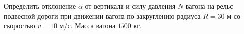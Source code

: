 Определить отклонение $\alpha$ от вертикали и силу давления $N$ вагона
на рельс подвесной дороги при движении вагона по закруглению
радиуса $R = 30$ м со скоростью $v = 10$ м/с.
Масса вагона $1500$ кг.
